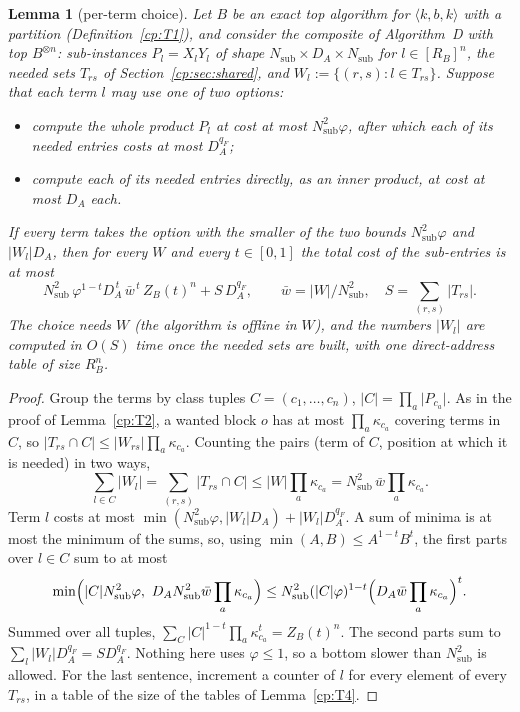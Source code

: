 \documentclass[11pt]{article}
\newtheorem{lemma}[theorem]{Lemma}
\theoremstyle{definition}
\theoremstyle{remark}
\newcommand{\abs}[1]{\lvert #1\rvert}
\newcommand{\mat}[3]{\langle #1,#2,#3\rangle} %
\newcommand{\ZB}{Z_B}                         %
\newcommand{\RB}{R_B}                         %
\newcommand{\AlgD}{Algorithm~D}                             %
\begin{document}
\begin{lemma}[per-term choice]\label{cp:A9}
Let $B$ be an exact top algorithm for $\mat kbk$ with a partition (Definition~\ref{cp:T1}), and consider the composite of \AlgD{} with top $B^{\otimes n}$: sub-instances $P_l=X_lY_l$ of shape $N_{\mathrm{sub}}\times D_A\times N_{\mathrm{sub}}$ for $l\in[\RB]^n$, the needed sets $T_{rs}$ of Section~\ref{cp:sec:shared}, and $W_l:=\{(r,s):l\in T_{rs}\}$. Suppose that each term $l$ may use one of two options:
\begin{itemize}
\item[(F)] compute the whole product $P_l$ at cost at most $N_{\mathrm{sub}}^2\varphi$, after which each of its needed entries costs at most $D_A^{q_F}$;
\item[(S)] compute each of its needed entries directly, as an inner product, at cost at most $D_A$ each.
\end{itemize}
If every term takes the option with the smaller of the two bounds $N_{\mathrm{sub}}^2\varphi$ and $\abs{W_l}D_A$, then for every $W$ and every $t\in[0,1]$ the total cost of the sub-entries is at most
\[
N_{\mathrm{sub}}^2\,\varphi^{1-t}D_A^{\,t}\,\bar w^{\,t}\,\ZB(t)^n+S\,D_A^{q_F},\qquad\bar w=\abs W/N_{\mathrm{sub}}^2,\quad S=\sum_{(r,s)}\abs{T_{rs}} .
\]
The choice needs $W$ (the algorithm is offline in $W$), and the numbers $\abs{W_l}$ are computed in $O(S)$ time once the needed sets are built, with one direct-address table of size $\RB^n$.
\end{lemma}

\begin{proof}
Group the terms by class tuples $C=(c_1,\dots,c_n)$, $\abs C=\prod_a\abs{P_{c_a}}$. As in the proof of Lemma~\ref{cp:T2}, a wanted block $o$ has at most $\prod_a\kappa_{c_a}$ covering terms in $C$, so $\abs{T_{rs}\cap C}\le\abs{W_{rs}}\prod_a\kappa_{c_a}$. Counting the pairs (term of $C$, position at which it is needed) in two ways,
\[
\sum_{l\in C}\abs{W_l}=\sum_{(r,s)}\abs{T_{rs}\cap C}\le\abs W\prod_a\kappa_{c_a}=N_{\mathrm{sub}}^2\,\bar w\prod_a\kappa_{c_a}.
\]
Term $l$ costs at most $\min(N_{\mathrm{sub}}^2\varphi,\abs{W_l}D_A)+\abs{W_l}D_A^{q_F}$. A sum of minima is at most the minimum of the sums, so, using $\min(A,B)\le A^{1-t}B^t$, the first parts over $l\in C$ sum to at most
\[
\min\Bigl(\abs CN_{\mathrm{sub}}^2\varphi,\ D_AN_{\mathrm{sub}}^2\bar w\prod_a\kappa_{c_a}\Bigr)\le N_{\mathrm{sub}}^2(\abs C\varphi)^{1-t}\Bigl(D_A\bar w\prod_a\kappa_{c_a}\Bigr)^t .
\] Summed over all tuples, $\sum_C\abs C^{1-t}\prod_a\kappa_{c_a}^t=\ZB(t)^n$. The second parts sum to $\sum_l\abs{W_l}D_A^{q_F}=SD_A^{q_F}$. Nothing here uses $\varphi\le1$, so a bottom slower than $N_{\mathrm{sub}}^2$ is allowed. For the last sentence, increment a counter of $l$ for every element of every $T_{rs}$, in a table of the size of the tables of Lemma~\ref{cp:T4}.
\end{proof}
\end{document}
